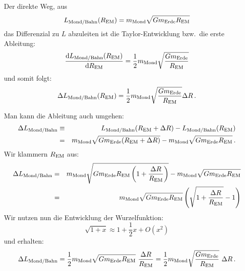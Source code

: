 Der direkte Weg, aus 
\begin{equation}
        L_{\rm Mond/Bahn}(R_{\rm EM}) = m_{\rm Mond} \sqrt{G m_{\rm Erde} R_{\rm EM}} 
\end{equation}
das Differenzial zu $L$ abzuleiten ist die Taylor-Entwicklung bzw.\ die erste Ableitung:
\begin{equation}
       \frac{{\rm d} L_{\rm Mond/Bahn}(R_{\rm EM})}{{\rm d}R_{\rm EM}} = 
          \frac{1}{2} m_{\rm Mond} \sqrt{\frac{G m_{\rm Erde}}{R_{\rm EM}}} 
\end{equation}
und somit folgt:
\begin{equation}
       \Delta  L_{\rm Mond/Bahn}(R_{\rm EM}) = 
          \frac{1}{2} m_{\rm Mond} \sqrt{\frac{G m_{\rm Erde}}{R_{\rm EM}}} \Delta R \, .
\end{equation}

Man kann die Ableitung auch umgehen:
\begin{eqnarray}
        \Delta L_{\rm Mond/Bahn} & \equiv &   L_{\rm Mond/Bahn}(R_{\rm EM}+\Delta R) -  L_{\rm Mond/Bahn}(R_{\rm EM}) \\
        &=& m_{\rm Mond} \sqrt{G m_{\rm Erde} ( R_{\rm EM} + \Delta R)} - m_{\rm Mond} \sqrt{G m_{\rm Erde} R_{\rm EM}}
          \, .
\end{eqnarray}
Wir klammern $R_{\rm EM}$ aus:
\begin{eqnarray}
        \Delta L_{\rm Mond/Bahn}
        &=&  m_{\rm Mond} \sqrt{G m_{\rm Erde} R_{\rm EM} \left( 1 + \frac{\Delta R}{R_{\rm EM}}\right) }  
                   - m_{\rm Mond} \sqrt{G m_{\rm Erde} R_{\rm EM}}  \\
      &=& m_{\rm Mond} \sqrt{G m_{\rm Erde} R_{\rm EM}} \left( \sqrt{1 + \frac{\Delta R}{R_{\rm EM}} } - 1 \right)               
\end{eqnarray}
Wir nutzen nun die Entwicklung der Wurzelfunktion:
\begin{equation}
        \sqrt{1+ x} \approx 1 + \frac{1}{2} x + O(x^2)  
\end{equation}
und erhalten:
\begin{equation}
        \Delta L_{\rm Mond/Bahn}
        =\frac{1}{2} m_{\rm Mond} \sqrt{G m_{\rm Erde} R_{\rm EM}} ~   \frac{\Delta R}{R_{\rm EM}} 
        =\frac{1}{2} m_{\rm Mond} \sqrt{\frac{G m_{\rm Erde}}{R_{\rm EM}}} ~   \Delta R \, .
\end{equation}

%
